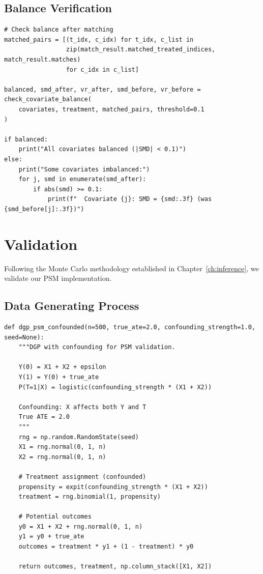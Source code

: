 \subsection{Balance Verification}

\begin{verbatim}
# Check balance after matching
matched_pairs = [(t_idx, c_idx) for t_idx, c_list in
                 zip(match_result.matched_treated_indices, match_result.matches)
                 for c_idx in c_list]

balanced, smd_after, vr_after, smd_before, vr_before = check_covariate_balance(
    covariates, treatment, matched_pairs, threshold=0.1
)

if balanced:
    print("All covariates balanced (|SMD| < 0.1)")
else:
    print("Some covariates imbalanced:")
    for j, smd in enumerate(smd_after):
        if abs(smd) >= 0.1:
            print(f"  Covariate {j}: SMD = {smd:.3f} (was {smd_before[j]:.3f})")
\end{verbatim}


\section{Validation}
\label{sec:psm_validation}

Following the Monte Carlo methodology established in Chapter~\ref{ch:inference}, we validate our PSM implementation.

\subsection{Data Generating Process}

\begin{verbatim}
def dgp_psm_confounded(n=500, true_ate=2.0, confounding_strength=1.0, seed=None):
    """DGP with confounding for PSM validation.

    Y(0) = X1 + X2 + epsilon
    Y(1) = Y(0) + true_ate
    P(T=1|X) = logistic(confounding_strength * (X1 + X2))

    Confounding: X affects both Y and T
    True ATE = 2.0
    """
    rng = np.random.RandomState(seed)
    X1 = rng.normal(0, 1, n)
    X2 = rng.normal(0, 1, n)

    # Treatment assignment (confounded)
    propensity = expit(confounding_strength * (X1 + X2))
    treatment = rng.binomial(1, propensity)

    # Potential outcomes
    y0 = X1 + X2 + rng.normal(0, 1, n)
    y1 = y0 + true_ate
    outcomes = treatment * y1 + (1 - treatment) * y0

    return outcomes, treatment, np.column_stack([X1, X2])
\end{verbatim}

